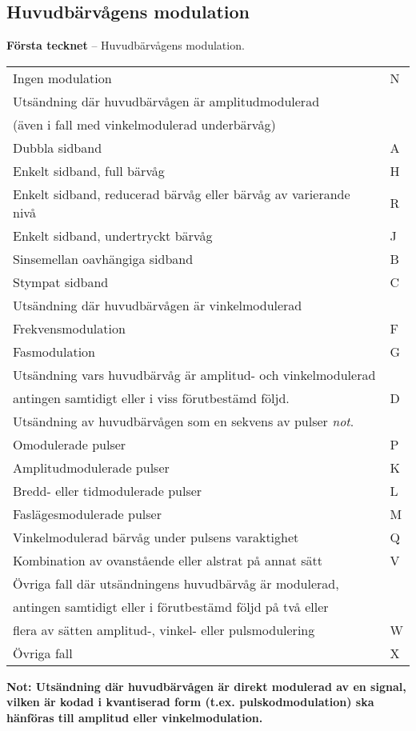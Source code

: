 \subsection{Huvudbärvågens modulation}
\textbf{Första tecknet} -- Huvudbärvågens modulation.\\
\begin{tabular}{ll}
	Ingen modulation & N\\
	Utsändning där huvudbärvågen är amplitudmodulerad &\\
	(även i fall med vinkelmodulerad underbärvåg) &\\
	Dubbla sidband & A\\
	Enkelt sidband, full bärvåg & H\\
	Enkelt sidband, reducerad bärvåg eller bärvåg av varierande nivå & R\\
	Enkelt sidband, undertryckt bärvåg & J\\
	Sinsemellan oavhängiga sidband & B\\
	Stympat sidband & C\\
	Utsändning där huvudbärvågen är vinkelmodulerad &\\
	Frekvensmodulation & F\\
	Fasmodulation & G\\
	Utsändning vars huvudbärvåg är amplitud- och vinkelmodulerad &\\
	antingen samtidigt eller i viss förutbestämd följd. & D\\
	Utsändning av huvudbärvågen som en sekvens av pulser \emph{not}. &\\
	Omodulerade pulser & P \\
	Amplitudmodulerade pulser & K\\
	Bredd- eller tidmodulerade pulser & L\\
	Faslägesmodulerade pulser & M\\
	Vinkelmodulerad bärvåg under pulsens varaktighet & Q\\
	Kombination av ovanstående eller alstrat på annat sätt & V\\
	Övriga fall där utsändningens huvudbärvåg är modulerad, &\\
	antingen samtidigt eller i förutbestämd följd på två eller &\\
	flera av sätten amplitud-, vinkel- eller pulsmodulering & W\\
	Övriga fall & X\\
\end{tabular}

\textbf{Not: Utsändning där huvudbärvågen är direkt modulerad av en signal,
  vilken är kodad i kvantiserad form (t.ex. pulskodmodulation) ska hänföras till
  amplitud eller vinkelmodulation.}

